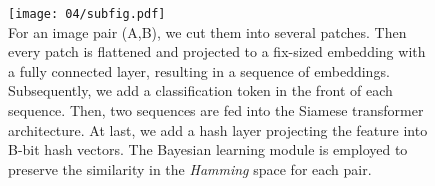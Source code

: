 \begin{figure}[!htp]
    \centering
    \texttt{[image: 04/subfig.pdf]} \\
      {For an image pair (A,B), we cut them into several patches. Then every patch is flattened and projected to a fix-sized embedding with a fully connected layer, resulting in a sequence of embeddings. Subsequently, we add a classification token in the front of each sequence. Then, two sequences are fed into the Siamese transformer architecture. At last, we add a hash layer projecting the feature into B-bit hash vectors. The Bayesian learning module is employed to preserve the similarity in the \textit{Hamming} space for each pair. }
   \label{fig:subfig}
\end{figure} 

